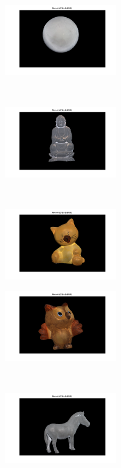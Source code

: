 \documentclass{paper}
\begin{document}
\begin{figure}[h!]
    \centering
    \begin{subfigure}[]{0.33\textwidth}
        \centering
        \includegraphics[height=1.2in]{sphereRGB}
    \end{subfigure}%
    ~ 
    \begin{subfigure}[]{0.33\textwidth}
        \centering
        \includegraphics[height=1.2in]{buddhaRGB}
    \end{subfigure}%
    ~ 
    \begin{subfigure}[]{0.33\textwidth}
        \centering
        \includegraphics[height=1.2in]{catRGB}
    \end{subfigure}
        \begin{subfigure}[]{0.33\textwidth}
        \centering
        \includegraphics[height=1.2in]{owlRGB}
    \end{subfigure}%
    ~ 
    \begin{subfigure}[]{0.33\textwidth}
        \centering
        \includegraphics[height=1.2in]{zebraRGB}

\end{subfigure}
\end{figure}
\end{document}
